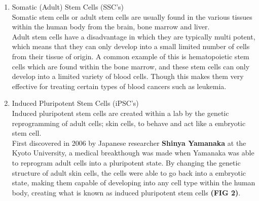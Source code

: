 \documentclass[20pt,margin=1in,innermargin=-4.5in,blockverticalspace=-0.25in]{tikzposter}
\begin{document}
\begin{columns}
{\begin{enumerate}
            \item Somatic (Adult) Stem Cells (SSC's) \\
            Somatic stem cells or adult stem cells are usually found in the various tissues within the human body from the brain, bone marrow and liver. \\
        	Adult stem cells have a disadvantage in which they are typically multi potent, which means that they can only develop into a small limited number of cells from their tissue of origin. A common example of this is hematopoietic stem cells which are found within the bone marrow, and these stem cells can only develop into a limited variety of blood cells. Though this makes them very effective for treating certain types of blood cancers such as leukemia.

            \item Induced Pluripotent Stem Cells (iPSC's) \\
            Induced pluripotent stem cells are created within a lab by the genetic reprogramming of adult cells; skin cells, to behave and act like a embryotic stem cell. \\
        	First discovered in 2006 by Japanese researcher \textbf{Shinya Yamanaka} at the Kyoto University, a medical breakthough was made when Yamanaka was able to reprogram adult cells into a pluripotent state. By changing the genetic structure of adult skin cells, the cells were able to go back into a embryotic state, making them capable of developing into any cell type within the human body, creating what is known as induced pluripotent stem cells \textbf{(FIG 2)}. \\
         
        \end{enumerate}
    }

\end{columns}
\end{document}
